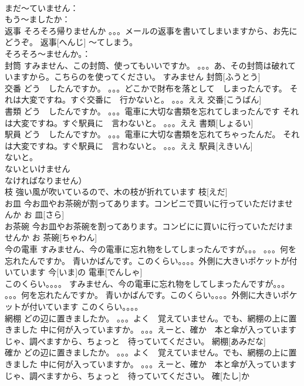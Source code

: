 \documentclass[8pt]{extreport}
\begin{document}
\begin{CJK}{UTF8}{min}
\\	まだ～ていません：
\\	もう～ましたか：
\\	返事	そろそろ帰りませんか 。。。メールの返事を書いてしまいますから、お先にどうぞ。	返事[へんじ]				～てしまう。
\\	そろそろ～ませんか。：
\\	封筒	すみません、この封筒、使ってもいいですか。 。。。あ、その封筒は破れていますから。こちらのを使ってください。 すみません	封筒[ふうとう]			
\\	交番	どう　したんですか。 。。。どこかで財布を落として　しまったんです。 それは大変ですね。すぐ交番に　行かないと。 。。。ええ	交番[こうばん]			
\\	書類	どう　したんですか。 。。。電車に大切な書類を忘れてしまったんです それは大変ですね。すぐ駅員に　言わないと。 。。。ええ	書類[しょるい]			
\\	駅員	どう　したんですか。 。。。電車に大切な書類を忘れてちゃったんだ。 それは大変ですね。すぐ駅員に　言わないと。 。。。ええ	駅員[えきいん]				
\\	ないと。
\\	ないといけません　
\\	なければなりません）　
\\	枝	強い風が吹いているので、木の枝が折れています	枝[えだ]			
\\	お皿	今お皿やお茶碗が割ってあります。コンビニで買いに行っていただけませんか	お 皿[さら]			
\\	お茶碗	今お皿やお茶碗を割ってあります。コンビにに買いに行っていただけませんか	お 茶碗[ちゃわん]					
\\	今の電車	すみません、今の電車に忘れ物をしてしまったんですが。。。 。。。何を忘れたんですか。 青いかばんです。このくらい。。。。外側に大きいポケットが付いています	今[いま]の 電車[でんしゃ]			
\\	このくらい。。。。	すみません、今の電車に忘れ物をしてしまったんですが。。。 。。。何を忘れたんですか。 青いかばんです。このくらい。。。。外側に大きいポケットが付いています	このくらい。。。。			
\\	網棚	どの辺に置きましたか。 。。。よく　覚えていません。でも、網棚の上に置きました 中に何が入っていますか。 。。。えーと、確か　本と傘が入っています じゃ、調べますから、ちょっと　待っていてください。	網棚[あみだな]					
\\	確か	どの辺に置きましたか。 。。。よく　覚えていません。でも、網棚の上に置きました 中に何が入っていますか。 。。。えーと、確か　本と傘が入っています じゃ、調べますから、ちょっと　待っていてください。	確[たし]か			

\end{CJK}
\end{document}
